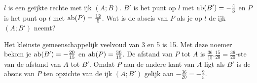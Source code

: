 \begin{voorbeeld}
	
$l$ is een geijkte rechte met ijk $(A;B)$.
$B'$ is het punt op $l$ met $\operatorname{ab} (B')=-\frac{4}{3}$ en $P$ is het punt op $l$ met $\operatorname{ab} (P)=\frac{12}{5}$.
Wat is de abscis van $P$ als je op $l$ de ijk $(A;B')$ neemt?

\begin{center}
\end{center}



Het kleinste gemeenschappelijk veelvoud van 3 en 5 is 15.
Met deze noemer bekom je $\operatorname{ab} (B')=-\frac{20}{15}$ en $\operatorname{ab} (P)=\frac{36}{15}$.
De afstand van $P$ tot $A$ is $\frac{36}{15}.\frac{15}{20}=\frac{36}{20}$-ste van de afstand van $A$ tot $B'$.
Omdat $P$ aan de andere kant van $A$ ligt als $B'$ is de abscis van $P$ ten opzichte van de ijk $(A;B')$ gelijk aan $-\frac{36}{20}=-\frac{9}{5}$.

\begin{center}
\end{center}

\end{voorbeeld}

